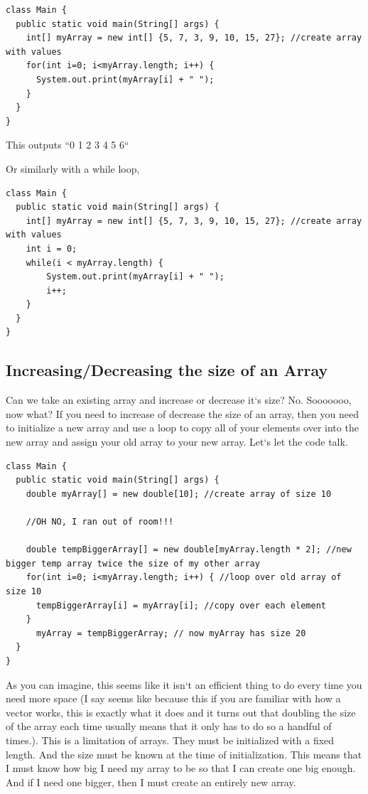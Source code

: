 \documentclass[11]{article}
\begin{document}
\begin{lstlisting}
class Main {
  public static void main(String[] args) {
    int[] myArray = new int[] {5, 7, 3, 9, 10, 15, 27}; //create array with values
    for(int i=0; i<myArray.length; i++) {
      System.out.print(myArray[i] + " ");
    }
  }
}
\end{lstlisting}

This outputs ``0 1 2 3 4 5 6``

Or similarly with a while loop,
\begin{lstlisting}
class Main {
  public static void main(String[] args) {
    int[] myArray = new int[] {5, 7, 3, 9, 10, 15, 27}; //create array with values
    int i = 0;
	while(i < myArray.length) {
		System.out.print(myArray[i] + " ");
		i++;	
	}    
  }
}
\end{lstlisting}
\subsection{Increasing/Decreasing the size of an Array}
Can we take an existing array and increase or decrease it`s size? No. Sooooooo, now what? If you need to increase of decrease the size of an array, then you need to initialize a new array and use a loop to copy all of your elements over into the new array and assign your old array to your new array. Let`s let the code talk.

\begin{lstlisting}
class Main {
  public static void main(String[] args) {
    double myArray[] = new double[10]; //create array of size 10

    //OH NO, I ran out of room!!!

    double tempBiggerArray[] = new double[myArray.length * 2]; //new bigger temp array twice the size of my other array
    for(int i=0; i<myArray.length; i++) { //loop over old array of size 10
      tempBiggerArray[i] = myArray[i]; //copy over each element
    }
      myArray = tempBiggerArray; // now myArray has size 20
  }
}
\end{lstlisting}

As you can imagine, this seems like it isn`t an efficient thing to do every time you need more space (I say seems like because this if you are familiar with how a vector works, this is exactly what it does and it turns out that doubling the size of the array each time usually means that it only has to do so a handful of times.). This is a limitation of arrays. They must be initialized with a fixed length. And the size must be known at the time of initialization. This means that I must know how big I need my array to be so that I can create one big enough. And if I need one bigger, then I must create an entirely new array.
\end{document}
